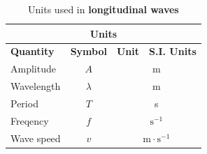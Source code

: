 \begin{table}[H]
\begin{center}
\begin{tabular}{|l|c|c|c|}\hline \hline 
\multicolumn{4}{|c|}{\textbf{Units}}\\ \hline \hline
\textbf{Quantity} & \textbf{Symbol} & \textbf{Unit} & \textbf{S.I. Units}\\ \hline
Amplitude & $A$ & \multicolumn{2}{c|}{m} \\ \hline
Wavelength & $\lambda$ & \multicolumn{2}{c|}{m}  \\ \hline
Period & $T$ & \multicolumn{2}{c|}{s}  \\ \hline
Freqency & $f$ & \multicolumn{2}{c|}{$\text{s}^{-1}$}  \\ \hline
Wave speed & $v$ & \multicolumn{2}{c|}{$\text{m} \cdot \text{s}^{-1}$} \\ \hline
\end{tabular}
\end{center}
\caption{Units used in \textbf{longitudinal waves} }
\label{table:electricity::units}
\end{table}
   \label{m38783*cid9}


